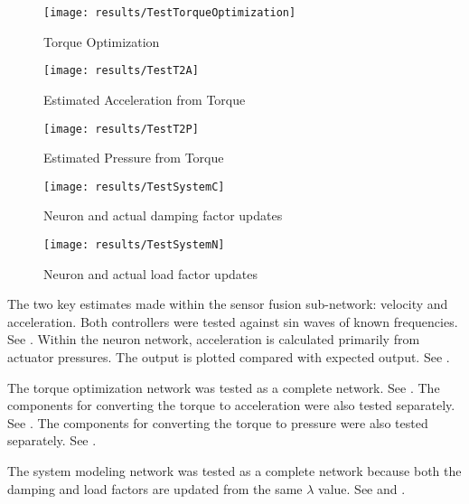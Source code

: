 \begin{figure}
\centering
\texttt{[image: results/TestTorqueOptimization]}
\caption{Torque Optimization}
\label{fig:TestTorqueOptimization}
\end{figure}

\begin{figure}
\centering
\texttt{[image: results/TestT2A]}
\caption{Estimated Acceleration from Torque}
\label{fig:TestT2A}
\end{figure}

\begin{figure}
\centering
\texttt{[image: results/TestT2P]}
\caption{Estimated Pressure from Torque}
\label{fig:TestT2P}
\end{figure}

\begin{figure}
\centering
\texttt{[image: results/TestSystemC]}
\caption{Neuron and actual damping factor updates}
\label{fig:TestSystemC1}
\end{figure}

\begin{figure}
\centering
\texttt{[image: results/TestSystemN]}
\caption{Neuron and actual load factor updates}
\label{fig:TestSystemN}
\end{figure}


The two key estimates made within the sensor fusion sub-network: velocity and
acceleration. Both controllers were tested against sin waves of known
frequencies. See .
Within the neuron network, acceleration is calculated primarily from actuator
pressures. The output is plotted compared with expected output. See
.


The torque optimization network was tested as a complete network. See
. The components for converting the torque to
acceleration were also tested
separately. See .
The components for converting the torque to pressure were also tested
separately. See .


The system modeling network was tested as a complete network because both the
damping and load factors are updated from the same $\lambda$ value. See  and .

